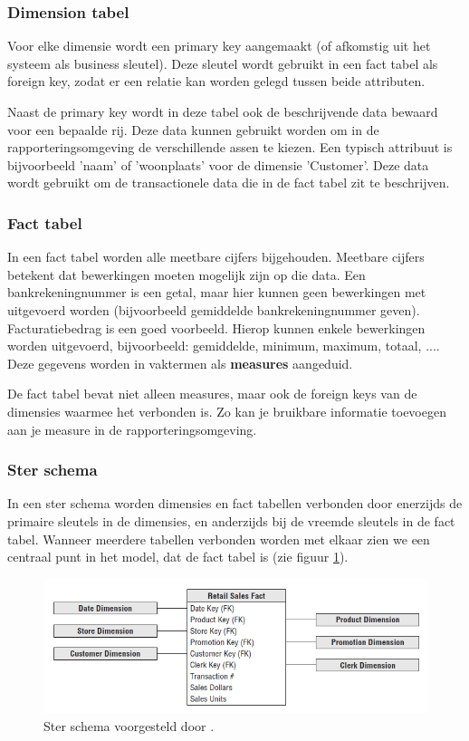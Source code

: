 \subsubsection{Dimension tabel}
Voor elke dimensie wordt een primary key aangemaakt (of afkomstig uit het systeem als business sleutel). Deze sleutel wordt gebruikt in een fact tabel als foreign key, zodat er een relatie kan worden gelegd tussen beide attributen.

Naast de primary key wordt in deze tabel ook de beschrijvende data bewaard voor een bepaalde rij. Deze data kunnen gebruikt worden om in de rapporteringsomgeving de verschillende assen te kiezen. Een typisch attribuut is bijvoorbeeld 'naam' of 'woonplaats' voor de dimensie 'Customer'. Deze data wordt gebruikt om de transactionele data die in de fact tabel zit te beschrijven.

\subsubsection{Fact tabel}
In een fact tabel worden alle meetbare cijfers bijgehouden. Meetbare cijfers betekent dat bewerkingen moeten mogelijk zijn op die data. Een bankrekeningnummer is een getal, maar hier kunnen geen bewerkingen met uitgevoerd worden (bijvoorbeeld gemiddelde bankrekeningnummer geven). Facturatiebedrag is een goed voorbeeld. Hierop kunnen enkele bewerkingen worden uitgevoerd, bijvoorbeeld: gemiddelde, minimum, maximum, totaal, .... Deze gegevens worden in vaktermen als \textbf{measures} aangeduid. 

De fact tabel bevat niet alleen measures, maar ook de foreign keys van de dimensies waarmee het verbonden is. Zo kan je bruikbare informatie toevoegen aan je measure in de rapporteringsomgeving.

\subsubsection{Ster schema}
In een ster schema worden dimensies en fact tabellen verbonden door enerzijds de primaire sleutels in de dimensies, en anderzijds bij de vreemde sleutels in de fact tabel. Wanneer meerdere tabellen verbonden worden met elkaar zien we een centraal punt in het model, dat de fact tabel is (zie figuur \ref{fig:ster}). 

\begin{figure}[h]
	\includegraphics[scale=0.8]{../images/ster.PNG}
	\caption{Ster schema voorgesteld door \textcite{Kimball2013}.}
	\label{fig:ster}
\end{figure}

